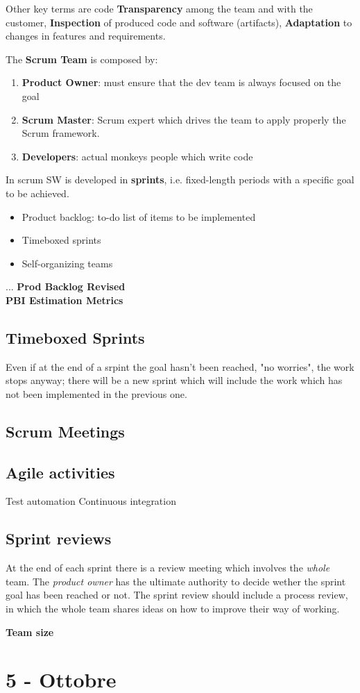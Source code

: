 Other key terms are code \textbf{Transparency} among the team and with the customer, \textbf{Inspection} of produced code and software (artifacts), \textbf{Adaptation} to changes in features and requirements.

The \textbf{Scrum Team} is composed by:
\begin{enumerate}
    \item \textbf{Product Owner}: must ensure that the dev team is always focused on the goal
    \item \textbf{Scrum Master}: Scrum expert which drives the team to apply properly the Scrum framework.
    \item \textbf{Developers}: actual monkeys people which write code
\end{enumerate}

In scrum SW is developed in \textbf{sprints}, i.e. fixed-length periods with a specific goal to be achieved.

\begin{itemize}
    \item Product backlog: to-do list of items to be implemented
    \item Timeboxed sprints
    \item Self-organizing teams
\end{itemize}

...
\textbf{Prod Backlog Revised}\\
\textbf{PBI Estimation Metrics}

\subsection{Timeboxed Sprints}
Even if at the end of a srpint the goal hasn't been reached, "no worries", the work stops anyway;
there will be a new sprint which will include the work which has not been implemented in the previous one.

\subsection{Scrum Meetings}

\subsection{Agile activities}
Test automation
Continuous integration

\subsection{Sprint reviews}
At the end of each sprint there is a review meeting which involves the \textit{whole} team.
The \textit{product owner} has the ultimate authority to decide wether the sprint goal has been reached or not.
The sprint review should include a process review, in which the whole team shares ideas on how to improve their way of working.

\textbf{Team size}\nl

\section{5 - Ottobre}


